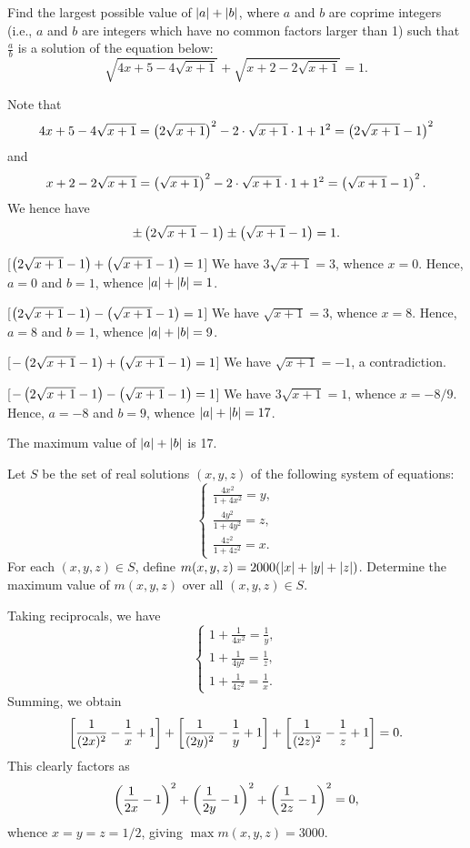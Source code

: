\begin{question}[17]\label{Q::2022-O-1-12}
    Find the largest possible value of $\left\lvert a \right\rvert + \left\lvert b \right\rvert$, where $a$ and $b$ are coprime integers (i.e., $a$ and $b$ are integers which have no common factors larger than 1) such that $\frac{a}{b}$ is a solution of the equation below: \[\sqrt{4x + 5 - 4\sqrt{x+1}} + \sqrt{x+2 - 2\sqrt{x+1}} = 1.\]
\end{question}
\begin{solution*}
    Note that \[4x + 5 - 4\sqrt{x+1} = \left( 2\sqrt{x+1} \right)^2 - 2\cdot\sqrt{x+1}\cdot1 + 1^2 = \left( 2\sqrt{x+1} - 1 \right)^2\] and \[x + 2 - 2\sqrt{x+1} = \left( \sqrt{x+1} \right)^2 - 2\cdot\sqrt{x+1}\cdot 1 + 1^2 = \left( \sqrt{x+1} - 1 \right)^2.\] We hence have \[\pm \left( 2\sqrt{x+1} - 1 \right) \pm \left( \sqrt{x+1} - 1 \right) = 1.\]

    [$\left( 2\sqrt{x+1} - 1 \right) + \left( \sqrt{x+1} - 1 \right) = 1$] We have $3\sqrt{x+1} = 3$, whence $x = 0$. Hence, $a = 0$ and $b = 1$, whence $\left\lvert a \right\rvert + \left\lvert b \right\rvert = 1$.

    [$\left( 2\sqrt{x+1} - 1 \right) - \left( \sqrt{x+1} - 1 \right) = 1$] We have $\sqrt{x+1} = 3$, whence $x = 8$. Hence, $a = 8$ and $b = 1$, whence $\left\lvert a \right\rvert + \left\lvert b \right\rvert = 9$.

    [$-\left( 2\sqrt{x+1} - 1 \right) + \left( \sqrt{x+1} - 1 \right) = 1$] We have $\sqrt{x+1} = -1$, a contradiction.

    [$-\left( 2\sqrt{x+1} - 1 \right) - \left( \sqrt{x+1} - 1 \right) = 1$] We have $3\sqrt{x+1} = 1$, whence $x = -8/9$. Hence, $a = -8$ and $b = 9$, whence $\left\lvert a \right\rvert + \left\lvert b \right\rvert = 17$.

    The maximum value of $\left\lvert a \right\rvert + \left\lvert b \right\rvert$ is 17.
\end{solution*}

\begin{question}[3000]\label{Q::2022-O-1-13}
    Let $S$ be the set of real solutions $(x, y, z)$ of the following system of equations: \[\left\{
        \begin{aligned}
            \frac{4x^2}{1 + 4x^2} = y,\\
            \frac{4y^2}{1 + 4y^2} = z,\\
            \frac{4z^2}{1 + 4z^2} = x.
        \end{aligned}\right.\] For each $(x, y, z) \in S$, define $m(x, y, z) = 2000(\left\lvert x \right\rvert + \left\lvert y \right\rvert + \left\lvert z \right\rvert)$. Determine the maximum value of $m(x, y, z)$ over all $(x, y, z) \in S$.
\end{question}
\begin{solution*}
    Taking reciprocals, we have \[\left\{
    \begin{aligned}
        1 + \frac1{4x^2} = \frac1y,\\
        1 + \frac1{4y^2} = \frac1z,\\
        1 + \frac1{4z^2} = \frac1x.
    \end{aligned}\right.\] Summing, we obtain \[\left[ \dfrac1{(2x)^2} - \dfrac1x + 1 \right] + \left[ \dfrac1{(2y)^2} - \dfrac1y + 1 \right] + \left[ \dfrac1{(2z)^2} - \dfrac1z + 1 \right] = 0.\] This clearly factors as \[\left( \dfrac1{2x} - 1 \right)^2 + \left( \dfrac1{2y} - 1 \right)^2 + \left( \dfrac1{2z} - 1 \right)^2 = 0,\] whence $x = y = z = 1/2$, giving $\max m(x, y, z) = 3000$.
\end{solution*}

